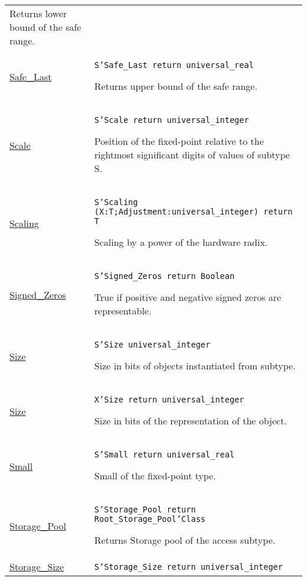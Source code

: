 \documentclass[english]{article}
\begin{document}
\begin{scriptsize}
\begin{multicols*}{3}
\begin{tabular}{@{}p{2cm}p{6.5cm}}
   Returns lower bound of the safe range.\\

   \href{http://www.ada-auth.org/standards/22rm/html/RM-K-2.html}{Safe\_Last} & \texttt{S'Safe\_Last return universal\_real}

   Returns upper bound of the safe range.\\

   \href{http://www.ada-auth.org/standards/22rm/html/RM-K-2.html}{Scale} & \texttt{S'Scale return universal\_integer}

   Position of the fixed-point relative to the rightmost significant digits of values of subtype S.\\

   \href{http://www.ada-auth.org/standards/22rm/html/RM-K-2.html}{Scaling} & \texttt{S'Scaling (X:T;Adjustment:universal\_integer) return T}

   Scaling by a power of the hardware radix.\\

   \href{http://www.ada-auth.org/standards/22rm/html/RM-K-2.html}{Signed\_Zeros} & \texttt{S'Signed\_Zeros return Boolean}

   True if positive and negative signed zeros are representable.\\

   \href{http://www.ada-auth.org/standards/22rm/html/RM-K-2.html}{Size} & \texttt{S'Size  universal\_integer}

   Size in bits of objects instantiated from subtype.\\

   \href{http://www.ada-auth.org/standards/22rm/html/RM-K-2.html}{Size} & \texttt{X'Size return universal\_integer}

   Size in bits of the representation of the object.\\

   \href{http://www.ada-auth.org/standards/22rm/html/RM-K-2.html}{Small} & \texttt{S'Small return universal\_real}

   Small of the fixed-point type.\\

   \href{http://www.ada-auth.org/standards/22rm/html/RM-K-2.html}{Storage\_Pool} & \texttt{S'Storage\_Pool return Root\_Storage\_Pool'Class}

   Returns Storage pool of the access subtype.\\

   \href{http://www.ada-auth.org/standards/22rm/html/RM-K-2.html}{Storage\_Size} & \texttt{S'Storage\_Size return universal\_integer}


\end{tabular}
\end{multicols*}
\end{scriptsize}
\end{document}
